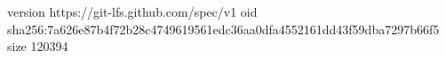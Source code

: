 version https://git-lfs.github.com/spec/v1
oid sha256:7a626e87b4f72b28c4749619561edc36aa0dfa4552161dd43f59dba7297b66f5
size 120394
